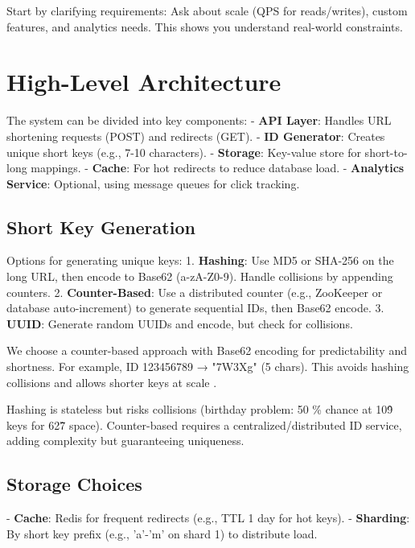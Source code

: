 \begin{interviewtip}
Start by clarifying requirements: Ask about scale (QPS for reads/writes), custom features, and analytics needs. This shows you understand real-world constraints.
\end{interviewtip}

\section{High-Level Architecture}

The system can be divided into key components:
- \textbf{API Layer}: Handles URL shortening requests (POST) and redirects (GET).
- \textbf{ID Generator}: Creates unique short keys (e.g., 7-10 characters).
- \textbf{Storage}: Key-value store for short-to-long mappings.
- \textbf{Cache}: For hot redirects to reduce database load.
- \textbf{Analytics Service}: Optional, using message queues for click tracking.

\subsection{Short Key Generation}
Options for generating unique keys:
1. \textbf{Hashing}: Use MD5 or SHA-256 on the long URL, then encode to Base62 (a-zA-Z0-9). Handle collisions by appending counters.
2. \textbf{Counter-Based}: Use a distributed counter (e.g., ZooKeeper or database auto-increment) to generate sequential IDs, then Base62 encode.
3. \textbf{UUID}: Generate random UUIDs and encode, but check for collisions.

\begin{designbox}
We choose a counter-based approach with Base62 encoding for predictability and shortness. For example, ID 123456789 → "7W3Xg" (5 chars). This avoids hashing collisions and allows shorter keys at scale \cite{designgurus}.
\end{designbox}

\begin{tradeoff}
Hashing is stateless but risks collisions (birthday problem: 50 \% chance at 10\^9 keys for 62\^7 space). Counter-based requires a centralized/distributed ID service, adding complexity but guaranteeing uniqueness.
\end{tradeoff}

\subsection{Storage Choices}
- \textbf{Cache}: Redis for frequent redirects (e.g., TTL 1 day for hot keys).
- \textbf{Sharding}: By short key prefix (e.g., 'a'-'m' on shard 1) to distribute load.

